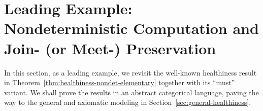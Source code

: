 \documentclass[9pt, preprint]{sigplanconf}
\theoremstyle{theorem}
\theoremstyle{definition}
\newtheorem{definition}[theorem]{Definition}
\newtheorem{remark}[theorem]{Remark}
\newcommand{\pow}{\mathcal{P}}
\newcommand{\set}[2]{\left\{\, #1 \mathrel{}\middle|\mathrel{} #2 \,\right\}}
\renewcommand{\subset}{\subseteq}
\newif\ifignore \ignorefalse
\newcommand{\auxproof}[1]{
\ifignore\mbox{}\newline
\textbf{BEGIN: AUX-PROOF} \dotfill\newline
{#1}\mbox{}\newline
\textbf{END: AUX-PROOF}\dotfill\newline
\fi}
\begin{document}
\auxproof{
\begin{definition}
  Let $R \subset X \times Y$ be a binary relation.
  We then define mappings
  $\exists_R, \forall_R \colon \pow{X} \to \pow{Y}$
  and
  $\Diamond_R, \Box_R \colon \pow{Y} \to \pow{X}$
  as follows:
  \begin{align*}
    \exists_R{X'} &= \set{y \in Y}{\exists x.\; x \mathrel{R} y \land x \in X'} \\
    \forall_R{X'} &= \set{y \in Y}{\forall x.\; x \mathrel{R} y \to   x \in X'} \\
    \Diamond_R{Y'} &= \set{x \in X}{\exists y.\; x \mathrel{R} y \land y \in Y'} \\
    \Box_R{Y'}     &= \set{x \in X}{\forall y.\; x \mathrel{R} y \to   y \in Y'} \enspace .
  \end{align*}

  The first operator $\exists_R$ takes the \emph{image} of a given set
  by $R$; the $\forall_R$ is the dual of $\exists_R$ (that is probably used less
  commonly).  The operators $\Diamond_R$ and $\Box_R$ are well-known in the
  context of modal logic. They  are called \emph{diamond modality} and
  \emph{box modality}.



\end{definition}

Notice that $\exists_R$ and $\forall_R$ work covariantly (with respect
to $R$) whereas $\Diamond_R$ and $\Box_R$ work contravariantly. In fact it holds that $\Diamond_R = \exists_{R^{-1}}$ and $\Box_R = \forall_{R^{-1}}$.
We have two pairs of adjunctions $\exists_R \dashv \Box_R$
and $\Diamond_R \dashv \forall_R$.

\begin{remark}
  If $R$ is functional, that is, there is a function $f\colon X\to Y$
  such that $x\mathrel{R}y$   if and only if $f(x)=y$,
then we have $\Box_R = \Diamond_R = f^{-1}$
  and the situation degenerates to the familiar adjunction
  $\forall_f \dashv f^{-1} \dashv \exists_f$.
\end{remark}
}

\section{Leading Example: Nondeterministic Computation and Join- (or
 Meet-) Preservation}
\label{sec:nondet}

In this section, as a leading example, we revisit the well-known
healthiness result in Theorem~\ref{thm:healthiness-nondet-elementary}
together with its ``must''
variant. We shall
 prove the results in an abstract categorical language, paving the way to the
 general and axiomatic modeling in
 Section~\ref{sec:general-healthiness}.
\end{document}

